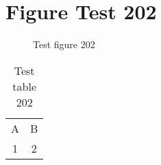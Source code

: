 \documentclass{article}
\begin{document}
\section{Figure Test 202}
\begin{figure}[h]
\caption{Test figure 202}
\end{figure}
\begin{table}[h]
\caption{Test table 202}
\begin{tabular}{cc}
A & B \\
1 & 2
\end{tabular}
\end{table}
\end{document}
